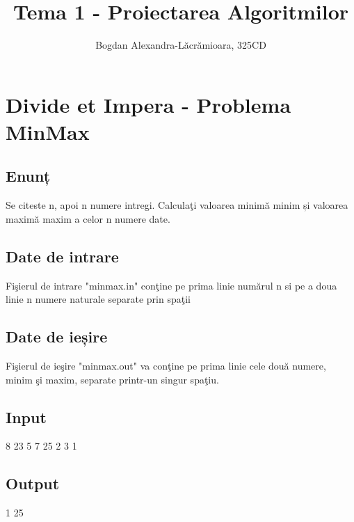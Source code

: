 \documentclass[runningheads]{llncs}
\begin{document}
\title{\textbf{Tema 1 - Proiectarea Algoritmilor}}

\author{Bogdan Alexandra-Lăcrămioara, 325CD}


\maketitle






\section{Divide et Impera - Problema MinMax}


\subsection{Enunț}


Se citeste n, apoi n numere intregi.\newline
Calculaţi valoarea minimă minim și valoarea maximă maxim a celor n numere date.

\newline

\subsection{Date de intrare}

Fişierul de intrare "minmax.in" conţine pe prima linie numărul n si pe a doua linie n numere naturale separate prin spaţii\newline

\subsection{Date de ieșire }
Fişierul de ieşire "minmax.out" va conţine pe prima linie cele două numere, minim şi maxim, separate printr-un singur spaţiu.
\subsection{Input}
 8 23 5 7 25 2 3 1 
 \newline
\subsection{Output}
1 25\newline
\end{document}
